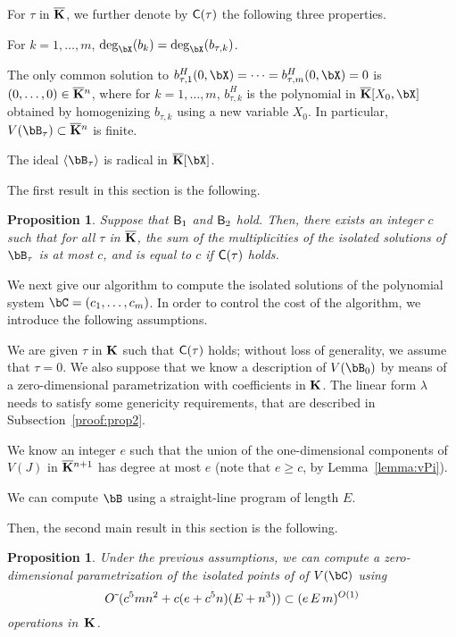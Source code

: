 \documentclass[12pt]{article}
\newtheorem{proposition}[definition]{Proposition}
\begin{document}
For $\tau$ in $\overline{\mathbf{K}}$, we further denote by $\mathsf{C}(\tau)$ the
following three properties.
\begin{description}[leftmargin=*]
\item[$\assG_1(\tau).$] For $k=1,\dots,m$,
  $\deg_\bX(b_k)=\deg_\bX(b_{\tau,k})$.
\item[$\assG_2(\tau).$] The only common solution to
  $b_{\tau,1}^H(0,\bX)=\cdots=b_{\tau,m}^H(0,\bX)=0$ is
  $(0,\dots,0)\in\overline{\mathbf{K}}{}^n$, where for $k=1,\dots,m$, $b_{\tau,k}^H$ is
  the polynomial in $\KKbar[X_0,\bX]$ obtained by homogenizing
  $b_{\tau,k}$ using a new variable $X_0$. In particular, $V(\bB_\tau)
  \subset \KKbar{}^n$ is finite.
\item[$\assG_3(\tau).$] The ideal $\langle \bB_\tau \rangle$ is
  radical in $\KKbar[\bX]$.
\end{description}

The first result in this section is the following.
\begin{proposition}\label{prop:degree_fiber}
  Suppose that $\mathsf{B}_1$ and $\mathsf{B}_2$ hold. Then, there exists an
  integer $c$ such that for all $\tau$ in $\overline{\mathbf{K}}$, the sum of the
  multiplicities of the isolated solutions of $\bB_\tau$ is at most
  $c$, and is equal to $c$ if $\mathsf{C}(\tau)$ holds.
\end{proposition}

We next give our algorithm to compute the isolated solutions of the
polynomial system $\bC=(c_1,\dots,c_m)$. In order to control the cost
of the algorithm, we introduce the following assumptions.
\begin{description}[leftmargin=*]
\item[${\assD}_1$.] We are given $\tau$ in $\mathbf{K}$ such that $\mathsf{C}(\tau)$
  holds; without loss of generality, we assume that $\tau=0$. We also
  suppose that we know a description of $V(\bB_{0})$ by means of a
  zero-dimensional parametrization with
  coefficients in $\mathbf{K}$. The linear form $\lambda$ needs to satisfy
  some genericity requirements, that are described in
  Subsection~\ref{proof:prop2}.
\item[${\assD}_2$.] We know an integer $e$ such that the union of the
  one-dimensional components of $V(J)$ in $\overline{\mathbf{K}}{}^{n+1}$ has degree
  at most $e$ (note that $e \ge c$, by Lemma~\ref{lemma:vPi}).
\item[${\assD}_3$.] We can compute $\bB$ using a straight-line program
  of length $E$.
\end{description}
Then, the second main result in this section is the following.
\begin{proposition}\label{prop:compute_isolated}
  Under the previous assumptions, we can compute a zero-dimensional
  parametrization of the isolated points of 
 of $V(\bC)$ using
$${O}{\,\tilde{ }\,}(c^5 m n^2  + c(e+c^5 n)(E + n^3)) \subset (e\,E\,m)^{O(1)}$$ operations in~$\mathbf{K}$.
\end{proposition}
\end{document}
